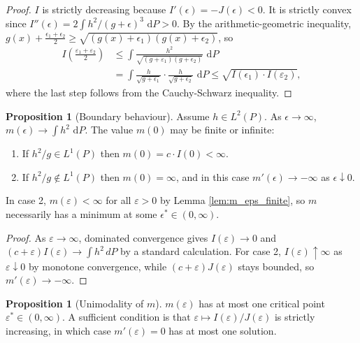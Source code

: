 \documentclass[11pt,reqno]{amsart}
\newcommand{\dd}{{\,\mathrm d}}
\theoremstyle{definition}
\newtheorem{prop}[thm]{Proposition}
\begin{document}
\begin{proof}
$I$ is strictly decreasing because  $I'(\epsilon) = -J(\epsilon) < 0$.
It is strictly  convex since  $I''(\epsilon) = 2\int h^2/(g+\epsilon)^3\,\dd P > 0$.
By the arithmetic-geometric inequality,
$g(x)+\frac{\epsilon_1+\epsilon_2}{2} \geq \sqrt{(g(x)+\epsilon_1)(g(x)+\epsilon_2)}$,
so
\begin{align*}
  I\!\left(\frac{\varepsilon_1+\varepsilon_2}{2}\right)
  & \leq \int \frac{h^2}{\sqrt{(g+\varepsilon_1)(g+\epsilon_2)}}\,\dd P
  \\& = \int \frac{h}{\sqrt{g+\epsilon_1}}\cdot\frac{h}{\sqrt{g+\epsilon_2}}\,\dd P
  \leq \sqrt{I(\epsilon_1)\cdot I(\varepsilon_2)},
\end{align*}
where the last step follows from the Cauchy-Schwarz inequality.
\end{proof}

\begin{prop}[Boundary behaviour]
\label{prop:boundary} Assume $h
\in L^2(P)$. 
As $\epsilon\to\infty$, $m(\epsilon)\to\int h^2\,\dd P$. The value $m(0)$
may be finite or infinite:
\begin{enumerate}
  \item If $h^2/g\in L^1(P)$ then $m(0) = c\cdot I(0) < \infty$.
  \item If $h^2/g\notin L^1(P)$ then $m(0) = \infty$, and in this case
    $m'(\epsilon)\to-\infty$ as $\epsilon\downarrow 0$.
\end{enumerate}
In case 2, $m(\varepsilon)<\infty$ for all $\varepsilon>0$ by
Lemma \ref{lem:m_eps_finite}, so $m$ necessarily has a minimum at some
$\epsilon^*\in(0,\infty)$.
\end{prop}

\begin{proof}
As $\varepsilon\to\infty$, dominated convergence gives
$I(\varepsilon)\to 0$ and $(c+\varepsilon)I(\varepsilon)\to\int h^2\,dP$
by a standard calculation. For case 2, $I(\varepsilon)\uparrow\infty$ as
$\varepsilon\downarrow 0$ by monotone convergence, while
$(c+\varepsilon)J(\varepsilon)$ stays bounded, so $m'(\varepsilon)\to-\infty$.
\end{proof}

\begin{prop}[Unimodality of $m$]
\label{prop:unimodal}
$m(\varepsilon)$ has at most one critical point $\varepsilon^*\in(0,\infty)$.
A sufficient condition is that $\varepsilon\mapsto I(\varepsilon)/J(\varepsilon)$
is strictly increasing, in which case $m'(\varepsilon)=0$ has at most one
solution.
\end{prop}
\end{document}
